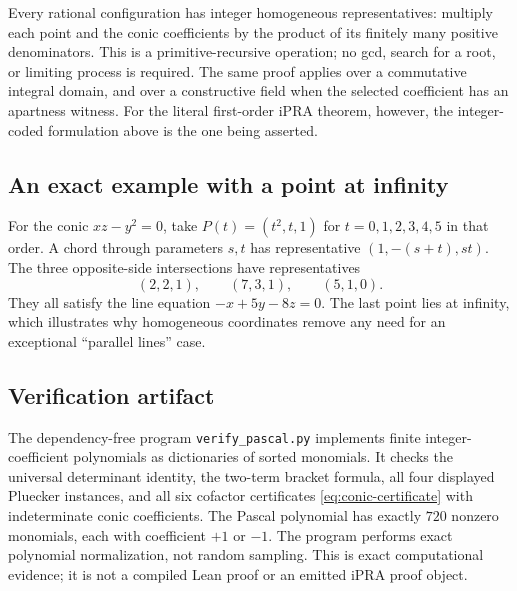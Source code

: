 Every rational configuration has integer homogeneous representatives:
multiply each point and the conic coefficients by the product of its
finitely many positive denominators.  This is a primitive-recursive
operation; no gcd, search for a root, or limiting process is required.
The same proof applies over a commutative integral domain, and over a
constructive field when the selected coefficient has an apartness witness.
For the literal first-order iPRA theorem, however, the integer-coded
formulation above is the one being asserted.

\subsection{An exact example with a point at infinity}
For the conic $xz-y^2=0$, take $P(t)=(t^2,t,1)$ for
$t=0,1,2,3,4,5$ in that order.  A chord through parameters $s,t$ has
representative $(1,-(s+t),st)$.  The three opposite-side intersections have
representatives
\[
 (2,2,1),\qquad(7,3,1),\qquad(5,1,0).
\]
They all satisfy the line equation $-x+5y-8z=0$.
The last point lies at infinity, which illustrates why homogeneous
coordinates remove any need for an exceptional ``parallel lines'' case.

\subsection{Verification artifact}
The dependency-free program \texttt{verify\_pascal.py} implements finite
integer-coefficient polynomials as dictionaries of sorted monomials.
It checks the universal determinant identity, the two-term bracket
formula, all four displayed Pluecker instances, and all six cofactor
certificates \eqref{eq:conic-certificate} with indeterminate conic
coefficients.  The Pascal polynomial has exactly $720$ nonzero monomials,
each with coefficient $+1$ or $-1$.  The program performs exact polynomial
normalization, not random sampling.  This is exact computational evidence; it is not a compiled Lean proof or
an emitted iPRA proof object.
